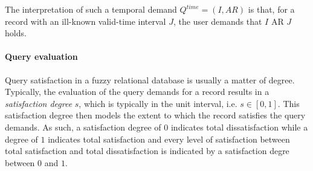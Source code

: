 The interpretation of such a temporal demand $Q^{time} = \left( I,AR \right)$ is that, for a record with an ill-known valid-time interval $J$, the user demands that $I$ AR $J$ holds.

\paragraph{\textbf{Query evaluation}}
\label{subsubsec:query-evaluation}
Query satisfaction in a fuzzy relational database is usually a matter of degree. Typically, the evaluation of the query demands for a record results in a \emph{satisfaction degree} $s$, which is typically in the unit interval, i.e. $s \in \left[ 0,1\right]$. This satisfaction degree then models the extent to which the record satisfies the query demands. As such, a satisfaction degree of $0$ indicates total dissatisfaction while a degree of $1$ indicates total satisfaction and every level of satisfaction between total satisfaction and total dissatisfaction is indicated by a satisfaction degre between $0$ and $1$.



